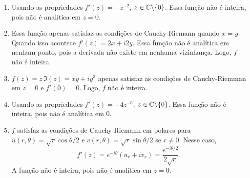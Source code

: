 \begin{questions}
\question{
Calcule $f'(z)$ para os seguintes casos, indicando onde esta derivada existe. Considere ${z = x + iy = r e^{i \theta}}$, sendo $\theta \in (-\pi,\pi]$. Quais destas funções são inteiras?
    \begin{multicols}{2}
    \begin{enumerate}[label=(\alph*)]
      \item $f(z) = z^{-1}$;
      \item $f(z) = x^2 + iy^2$;
      \item $f(z) = z \Im(z)$;
      \item $f(z) = z^{-4}$;
      \item $f(z) = \sqrt{r} e^{i\theta/2}$;
      \item $f(z) = \frac{z-1}{2z +1}$;
      \item $f(z) = (1 - 4z^2)^3$;
      \item $f(z) = e^{-\theta}\cos(\ln r) + i e^{-\theta}\sin(\ln r)$.
    \end{enumerate}
    \end{multicols}
}

\begin{solution}
   \begin{multicols}{2}
    \begin{enumerate}[label=(\alph*)]
      \item Usando as propriedades $f'(z) = -z^{-2}$, $z\in{\mathbb C}\backslash\{0\}$. Essa função não é inteira, pois não é analítica em $z=0$.
      
      \item Essa função apenas satisfaz as condições de Cauchy-Riemann quando $x=y$. Quando isso acontece $f'(z) = 2x + i2y$. Essa função não é analítica em nenhum ponto, pois a derivada não existe em nenhuma vizinhança. Logo, $f$ não é inteira.
      
      \item $f(z) = z\,\Im(z) = xy + i y^2$ apenas satisfaz as condições de Cauchy-Riemman em $z=0$ e $f'(0) = 0$. Logo, $f$ não é inteira.
      
      \item Usando as propriedades $f'(z) = -4z^{-5}$, $z\in{\mathbb C}\backslash\{0\}$. Essa função não é inteira, pois não é analítica em 0.
      
      \item $f$ satisfaz as condições de Cauchy-Riemann em polares para $u(r,\theta) = \sqrt{r} \cos \theta/2$ e $v(r,\theta) = \sqrt{r} \sin\theta/2$ se $r\neq 0$. Nesse caso,
      \[f'(z) = e^{-i\theta} (u_r +i v_r) = \frac{e^{-i\theta/2}}{2\sqrt{r}}.\]
      A função não é inteira, pois não é analítica em $z=0$.
      

\end{enumerate}
\end{multicols}
\end{solution}
\end{questions}
